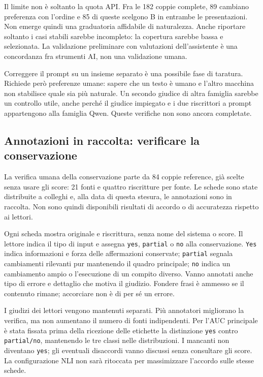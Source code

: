 Il limite non è soltanto la quota API. Fra le 182 coppie complete, 89 cambiano preferenza con l'ordine e 85 di queste scelgono B in entrambe le presentazioni. Non emerge quindi una graduatoria affidabile di naturalezza. Anche riportare soltanto i casi stabili sarebbe incompleto: la copertura sarebbe bassa e selezionata. La validazione preliminare con valutazioni dell'assistente è una concordanza fra strumenti AI, non una validazione umana.

Correggere il prompt su un insieme separato è una possibile fase di taratura. Richiede però preferenze umane: sapere che un testo è umano e l'altro macchina non stabilisce quale sia più naturale. Un secondo giudice di altra famiglia sarebbe un controllo utile, anche perché il giudice impiegato e i due riscrittori a prompt appartengono alla famiglia Qwen. Queste verifiche non sono ancora completate.

\subsection{Annotazioni in raccolta: verificare la conservazione}\label{annotazioni-in-raccolta-verificare-la-conservazione}

La verifica umana della conservazione parte da 84 coppie reference, già scelte senza usare gli score: 21 fonti e quattro riscritture per fonte. Le schede sono state distribuite a colleghi e, alla data di questa stesura, le annotazioni sono in raccolta. Non sono quindi disponibili risultati di accordo o di accuratezza rispetto ai lettori.

Ogni scheda mostra originale e riscrittura, senza nome del sistema o score. Il lettore indica il tipo di input e assegna \texttt{yes}, \texttt{partial} o \texttt{no} alla conservazione. \texttt{Yes} indica informazioni e forza delle affermazioni conservate; \texttt{partial} segnala cambiamenti rilevanti pur mantenendo il quadro principale; \texttt{no} indica un cambiamento ampio o l'esecuzione di un compito diverso. Vanno annotati anche tipo di errore e dettaglio che motiva il giudizio. Fondere frasi è ammesso se il contenuto rimane; accorciare non è di per sé un errore.

I giudizi dei lettori vengono mantenuti separati. Più annotatori migliorano la verifica, ma non aumentano il numero di fonti indipendenti. Per l'AUC principale è stata fissata prima della ricezione delle etichette la distinzione \texttt{yes} contro \nolinkurl{partial/no}, mantenendo le tre classi nelle distribuzioni. I mancanti non diventano \texttt{yes}; gli eventuali disaccordi vanno discussi senza consultare gli score. La configurazione NLI non sarà ritoccata per massimizzare l'accordo sulle stesse schede.

